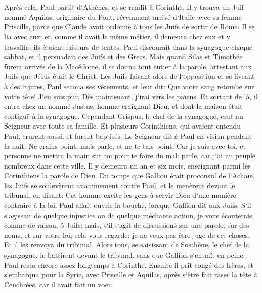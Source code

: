 \chapter{}

\verse Après cela, Paul partit d`Athènes, et se rendit à Corinthe. 
\verse Il y trouva un Juif nommé Aquilas, originaire du Pont, récemment arrivé d`Italie avec sa femme Priscille, parce que Claude avait ordonné à tous les Juifs de sortir de Rome. Il se lia avec eux; 
\verse et, comme il avait le même métier, il demeura chez eux et y travailla: ils étaient faiseurs de tentes. 
\verse Paul discourait dans la synagogue chaque sabbat, et il persuadait des Juifs et des Grecs. 
\verse Mais quand Silas et Timothée furent arrivés de la Macédoine, il se donna tout entier à la parole, attestant aux Juifs que Jésus était le Christ. 
\verse Les Juifs faisant alors de l`opposition et se livrant à des injures, Paul secoua ses vêtements, et leur dit: Que votre sang retombe sur votre tête! J`en suis pur. Dès maintenant, j`irai vers les païens. 
\verse Et sortant de là, il entra chez un nommé Justus, homme craignant Dieu, et dont la maison était contiguë à la synagogue. 
\verse Cependant Crispus, le chef de la synagogue, crut au Seigneur avec toute sa famille. Et plusieurs Corinthiens, qui avaient entendu Paul, crurent aussi, et furent baptisés. 
\verse Le Seigneur dit à Paul en vision pendant la nuit: Ne crains point; mais parle, et ne te tais point, 
\verse Car je suis avec toi, et personne ne mettra la main sur toi pour te faire du mal: parle, car j`ai un peuple nombreux dans cette ville. 
\verse Il y demeura un an et six mois, enseignant parmi les Corinthiens la parole de Dieu. 
\verse Du temps que Gallion était proconsul de l`Achaïe, les Juifs se soulevèrent unanimement contre Paul, et le menèrent devant le tribunal, 
\verse en disant: Cet homme excite les gens à servir Dieu d`une manière contraire à la loi. 
\verse Paul allait ouvrir la bouche, lorsque Gallion dit aux Juifs: S`il s`agissait de quelque injustice ou de quelque méchante action, je vous écouterais comme de raison, ô Juifs; 
\verse mais, s`il s`agit de discussions sur une parole, sur des noms, et sur votre loi, cela vous regarde: je ne veux pas être juge de ces choses. 
\verse Et il les renvoya du tribunal. 
\verse Alors tous, se saisissant de Sosthène, le chef de la synagogue, le battirent devant le tribunal, sans que Gallion s`en mît en peine. 
\verse Paul resta encore assez longtemps à Corinthe. Ensuite il prit congé des frères, et s`embarqua pour la Syrie, avec Priscille et Aquilas, après s`être fait raser la tête à Cenchrées, car il avait fait un voeu. 
